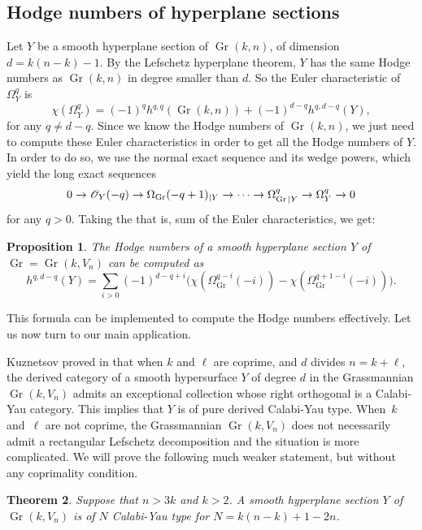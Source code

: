\documentclass[11pt]{article}
\theoremstyle{plain}
\newtheorem{theorem}{Theorem}\newtheorem*{theorem*}{Theorem}
\newtheorem{prop}[theorem]{Proposition}
\theoremstyle{definition}
\DeclareMathOperator{\Gr}{Gr}
\begin{document}
\subsection{Hodge numbers of hyperplane sections}\label{HG}
Let $Y$ be a smooth hyperplane section of $\Gr(k,n)$, of dimension $d=k(n-k)-1$.
By the Lefschetz hyperplane
theorem, $Y$ has the same Hodge numbers as $\Gr(k,n)$ in degree smaller than $d$. So
the Euler characteristic of $\Omega^q_{Y}$ is
\[
\chi(\Omega^q_{Y})=(-1)^qh^{q,q}(\Gr(k,n))+(-1)^{d-q}h^{q,d-q}(Y),
\]
for any $q\ne d-q$. Since we know the Hodge numbers of $\Gr(k,n)$, we just need to compute these
Euler characteristics in order to get all the Hodge numbers of $Y$. In order to
do so, we use the normal exact sequence and
its wedge powers, which yield the long exact sequences
\[
0\to\cO_Y(-q)\to \Omega_{\Gr}(-q+1)_{|Y}\to\cdots\to \Omega^q_{\Gr |Y}\to\Omega^q_{Y}\to 0
\]
for any $q>0$. Taking the that is,  sum of the Euler characteristics, we get:

\begin{prop}\label{hodgenumbers}
The Hodge numbers of a smooth hyperplane section $Y$ of $\Gr=\Gr(k,V_n)$ can be
computed as
\begin{equation*}
h^{q,d-q}(Y) = \sum_{i>0}(-1)^{d-q+i}\bigl(
\chi (\Omega_{\Gr}^{q-i}(-i))-\chi(\Omega_{\Gr}^{q+1-i}(-i))\bigr).
\end{equation*}
\end{prop}

This formula can be implemented to compute the Hodge numbers effectively.
Let us now turn to our main application.

Kuznetsov proved in \cite[Cor.\,4.4]{kuz-fractional} that when $k$ and $\ell$ are
coprime, and $d$ divides $n=k+\ell$, the derived category of a smooth hypersurface $Y$
of degree $d$ in the Grassmannian $\Gr(k,V_n)$ admits an exceptional collection whose
right orthogonal is a Calabi-Yau category. This implies that $Y$ is of pure derived Calabi-Yau type. When~$k$ and~$\ell$ are not coprime,
the Grassmannian $\Gr(k,V_n)$ does not necessarily admit a rectangular Lefschetz decomposition
and the situation is more complicated. We will prove the following much weaker statement,
but without any coprimality condition.

\begin{theorem}\label{thm:sect-of-G}
Suppose that $n>3k$ and $k>2$. A smooth hyperplane section $Y$ of $\Gr(k,V_n)$ is of $N$ Calabi-Yau type for $N=k(n-k)+1-2n$.
\end{theorem}
\end{document}
